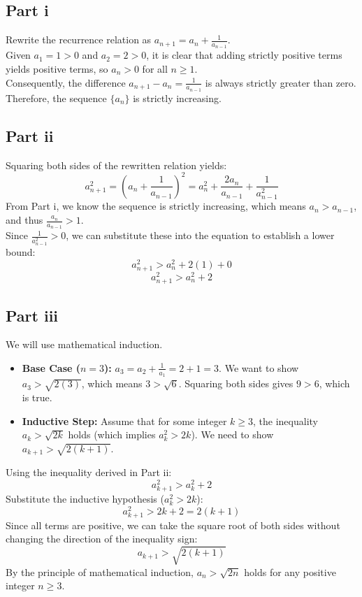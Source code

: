 \begin{solution}[Brief]
\subsection*{Part i}
Rewrite the recurrence relation as $a_{n+1} = a_n + \frac{1}{a_{n-1}}$. \\
Given $a_1 = 1 > 0$ and $a_2 = 2 > 0$, it is clear that adding strictly positive terms yields positive terms, so $a_n > 0$ for all $n \ge 1$. \\
Consequently, the difference $a_{n+1} - a_n = \frac{1}{a_{n-1}}$ is always strictly greater than zero. Therefore, the sequence $\{a_n\}$ is strictly increasing.

\subsection*{Part ii}
Squaring both sides of the rewritten relation yields:
\[ a_{n+1}^2 = \left(a_n + \frac{1}{a_{n-1}}\right)^2 = a_n^2 + \frac{2a_n}{a_{n-1}} + \frac{1}{a_{n-1}^2} \]
From Part i, we know the sequence is strictly increasing, which means $a_n > a_{n-1}$, and thus $\frac{a_n}{a_{n-1}} > 1$. \\
Since $\frac{1}{a_{n-1}^2} > 0$, we can substitute these into the equation to establish a lower bound:
\[ a_{n+1}^2 > a_n^2 + 2(1) + 0 \]
\[ a_{n+1}^2 > a_n^2 + 2 \]

\subsection*{Part iii}
We will use mathematical induction.
\begin{itemize}
    \item \textbf{Base Case ($n=3$):} $a_3 = a_2 + \frac{1}{a_1} = 2 + 1 = 3$. We want to show $a_3 > \sqrt{2(3)}$, which means $3 > \sqrt{6}$. Squaring both sides gives $9 > 6$, which is true.
    \item \textbf{Inductive Step:} Assume that for some integer $k \ge 3$, the inequality $a_k > \sqrt{2k}$ holds (which implies $a_k^2 > 2k$). We need to show $a_{k+1} > \sqrt{2(k+1)}$.
\end{itemize}
Using the inequality derived in Part ii:
\[ a_{k+1}^2 > a_k^2 + 2 \]
Substitute the inductive hypothesis ($a_k^2 > 2k$):
\[ a_{k+1}^2 > 2k + 2 = 2(k+1) \]
Since all terms are positive, we can take the square root of both sides without changing the direction of the inequality sign:
\[ a_{k+1} > \sqrt{2(k+1)} \]
By the principle of mathematical induction, $a_n > \sqrt{2n}$ holds for any positive integer $n \ge 3$.
\end{solution}

